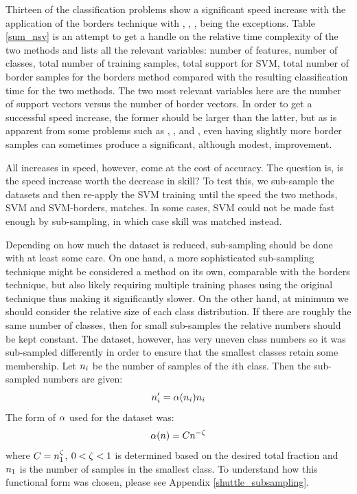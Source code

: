 Thirteen of the classification problems show a significant speed increase with the application
of the borders technique with , , ,  being the exceptions.
Table \ref{sum_nsv} is an attempt to get a handle on the relative time complexity 
of the two methods and lists all the relevant variables: number of features,
number of classes, total number of training samples, total support for SVM,
total number of border samples for the borders method compared with the resulting
classification time for the two methods. The two most relevant variables here are the
number of support vectors versus the number of border vectors.
In order to get a successful speed increase, the former should be larger than 
the latter, but as is apparent from some problems such as , , and ,
even having slightly more border samples can sometimes produce a significant,
although modest, improvement.

All increases in speed, however, come at the cost of accuracy.
The question is, is the speed increase worth the decrease in skill?
To test this, we sub-sample the datasets and then re-apply the SVM training
until the speed the two methods, SVM and SVM-borders, matches.
In some cases, SVM could not be made fast enough by sub-sampling, in which
case skill was matched instead.

Depending on how much the dataset is reduced, sub-sampling should be done with at
least some care. 
On one hand, a more sophisticated sub-sampling technique might be considered a method on its own, 
comparable with the borders technique, but also likely requiring multiple training phases using the
original technique thus making it significantly slower.
On the other hand, at minimum we should consider the relative size of each class distribution.
If there are roughly the same number of classes, then for small sub-samples the relative
numbers should be kept constant.
The  dataset, however, has very uneven class numbers so it was sub-sampled differently
in order to ensure that the smallest classes retain some membership.
Let $n_i$ be the number of samples of the $i$th class.
Then the sub-sampled numbers are given:
\begin{equation}
	n^\prime_i = \alpha(n_i) n_i
	\label{subsample}
\end{equation}
The form of $\alpha$ used for the  dataset was:
\begin{equation}
	\alpha(n) = C n^{-\zeta}
	\label{subfunction}
\end{equation}
where $C=n_1^\zeta$, $0 < \zeta < 1$ is determined based on the
desired total fraction and $n_1$ is the number of samples in the 
smallest class.
To understand how this functional form was chosen, please see Appendix \ref{shuttle_subsampling}.

